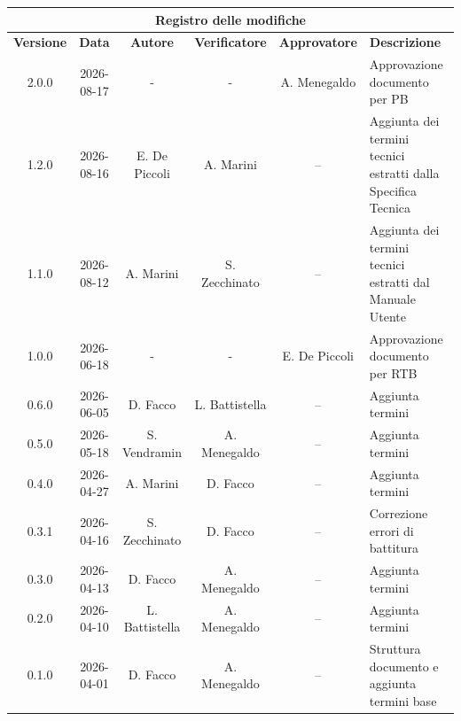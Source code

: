 \documentclass[a4paper, 10pt, colorlinks=true, linkcolor=black, urlcolor=blue, citecolor=blue, hidelinks]{article}
\begin{document}
\newcommand{\tipoverbale}{Glossario}
\newcommand{\titolo}{Glossario}
\newcommand{\dataversione}{2026-08-17}
\newcommand{\versione}{2.0.0}
\newcommand{\stato}{Approvato}
\newcommand{\destinatari}{Prof. Tullio Vardanega, prof. Riccardo Cardin, The Bitless}
\newcommand{\dir}{../../..}
\newcommand{\dataverbale}{}
\def\templatedir{../../../templates}


\newpage

\begin{center}
    \begin{tabularx}{\textwidth}{|c|c|c|c|c|>{\raggedright\arraybackslash}X|}
        \hline
        \multicolumn{6}{|c|}{\textbf{Registro delle modifiche}} \\
        \hline
        \textbf{Versione} & \textbf{Data} & \textbf{Autore} & \textbf{Verificatore} & \textbf{Approvatore} & \textbf{Descrizione} \\
        \hline
        2.0.0 & 2026-08-17 & - & - & A. Menegaldo & Approvazione documento per PB \\
        \hline
        1.2.0 & 2026-08-16 & E. De Piccoli & A. Marini & -- & Aggiunta dei termini tecnici estratti dalla Specifica Tecnica \\
        \hline
        1.1.0 & 2026-08-12 & A. Marini & S. Zecchinato & -- & Aggiunta dei termini tecnici estratti dal Manuale Utente \\
        \hline
        1.0.0 & 2026-06-18 & - & - & E. De Piccoli & Approvazione documento per RTB\\
        \hline
        0.6.0 & 2026-06-05 & D. Facco & L. Battistella & -- & Aggiunta termini \\
        \hline
        0.5.0 & 2026-05-18 & S. Vendramin & A. Menegaldo & -- & Aggiunta termini \\
        \hline
        0.4.0 & 2026-04-27 &  A. Marini & D. Facco & -- & Aggiunta termini \\
        \hline
        0.3.1 & 2026-04-16 & S. Zecchinato & D. Facco & -- & Correzione errori di battitura \\
        \hline
        0.3.0 & 2026-04-13 & D. Facco & A. Menegaldo & -- & Aggiunta termini \\
        \hline
        0.2.0 & 2026-04-10 & L. Battistella & A. Menegaldo & -- & Aggiunta termini \\
        \hline
        0.1.0 & 2026-04-01 & D. Facco & A. Menegaldo & -- & Struttura documento e aggiunta termini base \\
        \hline
    \end{tabularx}
\end{center}
\end{document}
